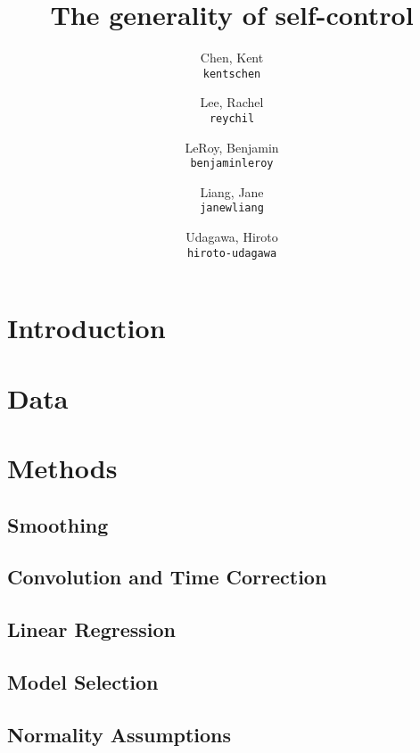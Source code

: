 \documentclass[11pt]{article}
\title{The generality of self-control}
\author{
  Chen, Kent\\
  \texttt{kentschen}
  \and
  Lee, Rachel\\
  \texttt{reychil}
  \and
  LeRoy, Benjamin\\
  \texttt{benjaminleroy}
  \and
  Liang, Jane\\
  \texttt{janewliang}
  \and
  Udagawa, Hiroto\\
  \texttt{hiroto-udagawa}
}
\begin{document}
\maketitle

\abstract{}

\section{Introduction} \label{introduction}
	

\section{Data} \label{data}

	
	
\section{Methods} \label{methods}
	\subsection{Smoothing}
	
		

	\subsection{Convolution and Time Correction}

		
		
	\subsection{Linear Regression}
	
		
		
	\subsection{Model Selection}
		
		

	\subsection{Normality Assumptions}
	
		
		
\end{document}

